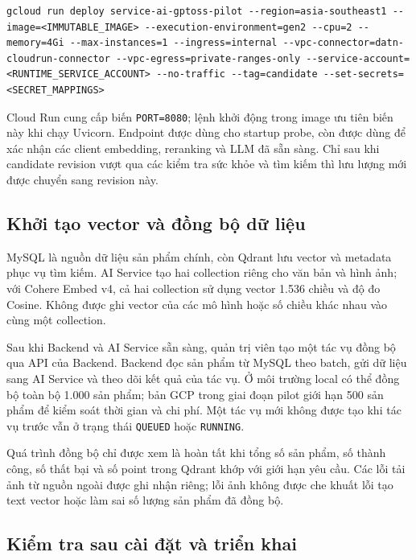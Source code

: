 \begin{lstlisting}[style=terminal,caption={Các tham số chính khi triển khai AI Service lên Cloud Run},label={lst:cloud-run-ai-deploy}]
gcloud run deploy service-ai-gptoss-pilot --region=asia-southeast1 --image=<IMMUTABLE_IMAGE> --execution-environment=gen2 --cpu=2 --memory=4Gi --max-instances=1 --ingress=internal --vpc-connector=datn-cloudrun-connector --vpc-egress=private-ranges-only --service-account=<RUNTIME_SERVICE_ACCOUNT> --no-traffic --tag=candidate --set-secrets=<SECRET_MAPPINGS>
\end{lstlisting}

Cloud Run cung cấp biến \texttt{PORT=8080}; lệnh khởi động trong image ưu tiên biến này khi chạy Uvicorn. Endpoint  được dùng cho startup probe, còn  được dùng để xác nhận các client embedding, reranking và LLM đã sẵn sàng. Chỉ sau khi candidate revision vượt qua các kiểm tra sức khỏe và tìm kiếm thì lưu lượng mới được chuyển sang revision này.

\subsection{Khởi tạo vector và đồng bộ dữ liệu}

MySQL là nguồn dữ liệu sản phẩm chính, còn Qdrant lưu vector và metadata phục vụ tìm kiếm. AI Service tạo hai collection riêng cho văn bản và hình ảnh; với Cohere Embed v4, cả hai collection sử dụng vector 1.536 chiều và độ đo Cosine. Không được ghi vector của các mô hình hoặc số chiều khác nhau vào cùng một collection.

Sau khi Backend và AI Service sẵn sàng, quản trị viên tạo một tác vụ đồng bộ qua API của Backend. Backend đọc sản phẩm từ MySQL theo batch, gửi dữ liệu sang AI Service và theo dõi kết quả của tác vụ. Ở môi trường local có thể đồng bộ toàn bộ 1.000 sản phẩm; bản GCP trong giai đoạn pilot giới hạn 500 sản phẩm để kiểm soát thời gian và chi phí. Một tác vụ mới không được tạo khi tác vụ trước vẫn ở trạng thái \texttt{QUEUED} hoặc \texttt{RUNNING}.

Quá trình đồng bộ chỉ được xem là hoàn tất khi tổng số sản phẩm, số thành công, số thất bại và số point trong Qdrant khớp với giới hạn yêu cầu. Các lỗi tải ảnh từ nguồn ngoài được ghi nhận riêng; lỗi ảnh không được che khuất lỗi tạo text vector hoặc làm sai số lượng sản phẩm đã đồng bộ.

\subsection{Kiểm tra sau cài đặt và triển khai}

